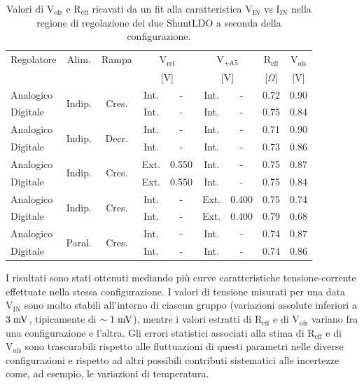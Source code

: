 \begin{table}
\begin{center}
\begin{tabular}{l|c|c|c|c|c|c|c|c}
Regolatore & Alim. & Rampa & \multicolumn{2}{c|}{$\mathrm{V_{ref}}$} & \multicolumn{2}{c|}{$\mathrm{V_{+A5}}$} & $\mathrm{R_{eff}}$& $\mathrm{V_{ofs}}$ \\
  &    &   & \multicolumn{2}{c|}{[V]}               & \multicolumn{2}{c|}{[V]}                & [$\Omega$]       & [V]               \\ \hline
Analogico & \multirow{2}{*}{Indip.} & \multirow{2}{*}{Cres.} & Int. & - & Int. & - & 0.72 & 0.90 \\
Digitale  &  &  & Int. & - & Int. & - & 0.75  & 0.84 \\ \hline

Analogico & \multirow{2}{*}{Indip.} & \multirow{2}{*}{Decr.} & Int. & - & Int. & - & 0.71 & 0.90 \\
Digitale  &  &  & Int. & - & Int. & - & 0.73  & 0.86 \\ \hline

Analogico & \multirow{2}{*}{Indip.} & \multirow{2}{*}{Cres.} & Ext. & 0.550 & Int. & - & 0.75 & 0.87 \\
Digitale  &  &  & Ext. & 0.550 & Int. & - & 0.75  & 0.84 \\ \hline

Analogico & \multirow{2}{*}{Indip.} & \multirow{2}{*}{Cres.} & Int. & - & Ext. & 0.400 & 0.75 & 0.74 \\
Digitale  &  &  & Int. & - & Ext. & 0.400 & 0.79  & 0.68 \\ \hline

Analogico & \multirow{2}{*}{Paral.} & \multirow{2}{*}{Cres.} & Int. & - & Int. & - & 0.74 & 0.87 \\
Digitale  &  &  & Int. & - & Int. & - & 0.74  & 0.86 \\
\end{tabular}
\caption{Valori di $\mathrm{V_{ofs}}$ e $\mathrm{R_{eff}}$ ricavati da un fit alla caratteristica $\mathrm{V_{IN}}$ vs $\mathrm{I_{IN}}$ nella regione di regolazione dei due ShuntLDO a seconda della configurazione.}
\label{table:results}
\end{center}
\end{table}


I risultati sono stati ottenuti mediando pi\`u curve caratteristiche tensione-corrente effettuate nella stessa configurazione. I valori di tensione misurati per una data $\mathrm{V_{IN}}$ sono molto stabili all'interno di ciascun gruppo (variazioni assolute inferiori a $3\rm \; mV$, tipicamente di $\sim 1\rm \; mV$), mentre i valori estratti di $\mathrm{R_{eff}}$ e di $\mathrm{V_{ofs}}$ variano fra una configurazione e l'altra.
Gli errori statistici associati alla stima di $\mathrm{R_{eff}}$ e di $\mathrm{V_{ofs}}$ sono trascurabili rispetto alle fluttuazioni di questi parametri nelle diverse configurazioni e rispetto ad altri possibili contributi sistematici alle incertezze come, ad esempio, le variazioni di temperatura. 

